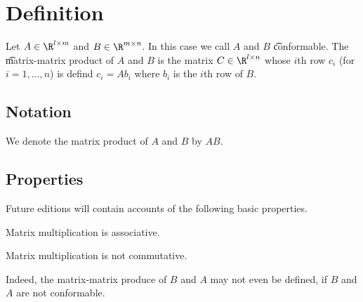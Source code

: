 
\section*{Definition}

Let $A \in \R ^{l \times  m}$ and $B \in \R ^{m \times  n}$.
In this case we call $A$ and $B$ \t{conformable}.
The \t{matrix-matrix product} of $A$ and $B$ is the matrix $C \in \R ^{l \times  n}$ whose $i$th row $c_i$ (for $i = 1, \dots , n$) is defind $c_i = Ab_i$ where $b_i$ is the $i$th row of $B$.

\subsection*{Notation}

We denote the matrix product of $A$ and $B$ by $AB$.

\subsection*{Properties}

Future editions will contain accounts of the following basic properties.

\begin{proposition}
Matrix multiplication is associative.
\end{proposition}

\begin{proposition}
Matrix multiplication is not commutative.
\end{proposition}
Indeed, the matrix-matrix produce of $B$ and $A$ may not even be defined, if $B$ and $A$ are not conformable.

\blankpage